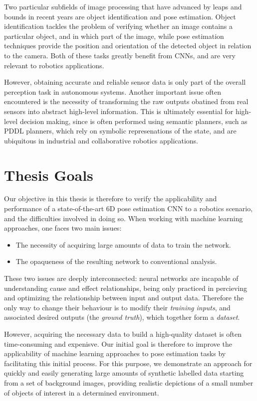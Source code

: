 Two particular subfields of image processing that have advanced by leaps and bounds in recent years are object identification and pose estimation. Object identification tackles the problem of verifying whether an image contains a particular object, and in which part of the image, while pose estimation techniques provide the position and orientation of the detected object in relation to the camera. Both of these tasks greatly benefit from CNNs, and are very relevant to robotics applications.

However, obtaining accurate and reliable sensor data is only part of the overall perception task in autonomous systems. Another important issue often encountered is the necessity of transforming the raw outputs obatined from real sensors into abstract high-level information. This is ultimately essential for high-level decision making, since is often performed using semantic planners, such as PDDL planners, which rely on symbolic represenations of the state, and are ubiquitous in industrial and collaborative robotics applications.

\section{Thesis Goals}

Our objective in this thesis is therefore to verify the applicability and performance of a state-of-the-art 6D pose estimation CNN to a robotics scenario, and the difficulties involved in doing so. When working with machine learning approaches, one faces two main issues:
\begin{itemize}
    \item The necessity of acquiring large amounts of data to train the network.
    \item The opaqueness of the resulting network to conventional analysis.
\end{itemize}
These two issues are deeply interconnected: neural networks are incapable of understanding cause and effect relationships, being only practiced in percieving and optimizing the relationship between input and output data. Therefore the only way to change their behaviour is to modify their \emph{training inputs}, and associated desired outputs (the \emph{ground truth}), which together form a \emph{dataset}.

However, acquiring the necessary data to build a high-quality dataset is often time-consuming and expenisve. Our initial goal is therefore to improve the applicability of machine learning approaches to pose estimation tasks by facilitating this initial process. For this purpose, we demonstrate an approach for quickly and easily generating large amounts of synthetic labelled data starting from a set of background images, providing realistic depictions of a small number of objects of interest in a determined environment.

